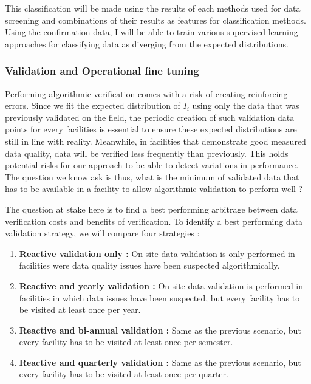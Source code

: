 This classification will be made using the results of each methods used for data screening and combinations of their results as features for classification methods. Using the confirmation data, I will be able to train various supervised learning approaches for classifying data as diverging from the expected distributions.

\subsubsection{Validation and Operational fine tuning}

Performing algorithmic verification comes with a risk of creating reinforcing errors. Since we fit the expected distribution of $I_i$ using only the data that was previously validated on the field, the periodic creation of such validation data points for every facilities is essential to ensure these expected distributions are still in line with reality. Meanwhile, in facilities that demonstrate good measured data quality, data will be verified less frequently than previously. This holds potential risks for our approach to be able to detect variations in performance. The question we know ask is thus, what is the minimum of validated data that has to be available in a facility to allow algorithmic validation to perform well ?

The question at stake here is to find a best performing arbitrage between data verification costs and benefits of verification. To identify a best performing data validation strategy, we will compare four strategies :

\begin{enumerate}
	\item \textbf{Reactive validation only :} On site data validation is only performed in facilities were data quality issues have been suspected algorithmically.
	\item \textbf{Reactive and yearly validation :} On site data validation is performed in facilities in which data issues have been suspected, but every facility has to be visited at least once per year.
	\item \textbf{Reactive and bi-annual validation :} Same as the previous scenario, but every facility has to be visited at least once per semester.
	\item \textbf{Reactive and quarterly validation :} Same as the previous scenario, but every facility has to be visited at least once per quarter.
\end{enumerate}

